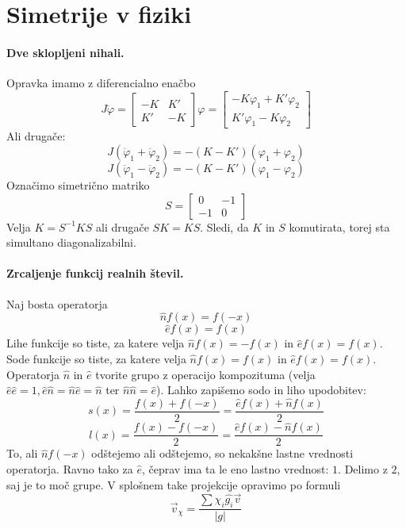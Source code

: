 \documentclass[a4paper]{article}
\newcommand{\vct}[1]{\overrightarrow{#1}}
\begin{document}
\section*{Simetrije v fiziki}
\paragraph{Dve sklopljeni nihali.} Opravka imamo z diferencialno enačbo
\[J\ddot\varphi = \begin{bmatrix}
    -K & K' \\
    K' & -K
\end{bmatrix}\varphi = \begin{bmatrix}
    -K\varphi_1 + K'\varphi_2 \\ K'\varphi_1 - K\varphi_2
\end{bmatrix}\]
Ali drugače:
\[J\left(\ddot\varphi_1 + \ddot\varphi_2\right) = -(K-K')(\varphi_1 + \varphi_2)\]
\[J\left(\ddot\varphi_1 - \ddot\varphi_2\right) = -(K-K')(\varphi_1 - \varphi_2)\]
Označimo simetrično matriko \[S = \begin{bmatrix}
    0 & -1 \\ -1 & 0
\end{bmatrix}\]
Velja \(K = S^{-1}KS\) ali drugače \(SK = KS\). Sledi, da \(K\) in \(S\) komutirata, torej sta simultano diagonalizabilni.
\paragraph{Zrcaljenje funkcij realnih števil.} Naj bosta operatorja
\[\widehat{n} f(x) = f(-x)\]
\[\widehat{e} f(x) = f(x)\]
Lihe funkcije so tiste, za katere velja \(\widehat{n} f(x) = -f(x)\) in \(\widehat{e} f(x) = f(x)\). Sode funkcije so tiste,
za katere velja \(\widehat{n}f(x) = f(x)\) in \(\widehat{e}f(x) = f(x)\). \\
Operatorja \(\widehat{n}\) in \(\widehat{e}\) tvorite grupo z operacijo kompozituma (velja \(\widehat{e}\widehat{e} = 1, \widehat{e}\widehat{n} = \widehat{n}\widehat{e} = \widehat{n}\) ter \(\widehat{n}\widehat{n} = \widehat{e}\)). Lahko zapišemo sodo in liho upodobitev:
\[s(x) = \frac{f(x) + f(-x)}{2} = \frac{\widehat{e}f(x) + \widehat{n}f(x)}{2}\]
\[l(x) = \frac{f(x) - f(-x)}{2} = \frac{\widehat{e}f(x) - \widehat{n}f(x)}{2}\]
To, ali \(\widehat{n}f(-x)\) odštejemo ali odštejemo, so nekakšne lastne vrednosti operatorja. Ravno tako za \(\widehat{e}\), čeprav ima ta le eno lastno vrednost: \(1\). Delimo z \(2\), saj je to moč grupe.
V splošnem take projekcije opravimo po formuli \[\vct{v}_\chi = \frac{\sum \chi_i\widehat{g_i}\vct{v}}{|g|}\]
\end{document}
